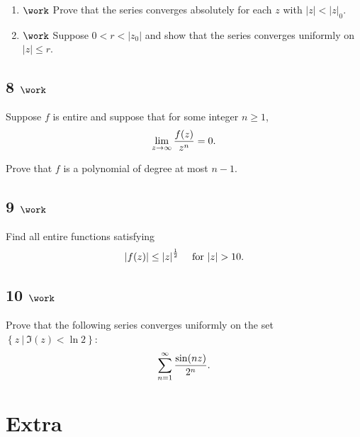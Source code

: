 \begin{enumerate}
\def\labelenumi{\alph{enumi}.}
\item
  \(\work\) Prove that the series converges absolutely for each \(z\)
  with
  \({\left\lvert {z} \right\rvert} < {\left\lvert {z} \right\rvert}_0\).
\item
  \(\work\) Suppose \(0 < r < {\left\lvert {z_0} \right\rvert}\) and
  show that the series converges uniformly on
  \({\left\lvert {z} \right\rvert} \leq r\).
\end{enumerate}

\hypertarget{work-27}{%
\subsection{\texorpdfstring{8
\(\work\)}{8 \textbackslash work}}\label{work-27}}

Suppose \(f\) is entire and suppose that for some integer \(n\geq 1\),
\begin{align*}
\lim_{z\to \infty} {f(z) \over z^n} = 0
.\end{align*}

Prove that \(f\) is a polynomial of degree at most \(n-1\).

\hypertarget{work-28}{%
\subsection{\texorpdfstring{9
\(\work\)}{9 \textbackslash work}}\label{work-28}}

Find all entire functions satisfying
\begin{align*}
{\left\lvert {f(z)} \right\rvert} \leq {\left\lvert {z} \right\rvert}^{1\over 2} \quad\text{ for } {\left\lvert {z} \right\rvert} > 10
.\end{align*}

\hypertarget{work-29}{%
\subsection{\texorpdfstring{10
\(\work\)}{10 \textbackslash work}}\label{work-29}}

Prove that the following series converges uniformly on the set
\(\left\{{z {~\mathrel{\Big|}~}\Im(z) < \ln 2}\right\}\):
\begin{align*}
\sum_{n=1}^\infty {\sin(nz) \over 2^n}
.\end{align*}

\hypertarget{extra-1}{%
\section{Extra}\label{extra-1}}

